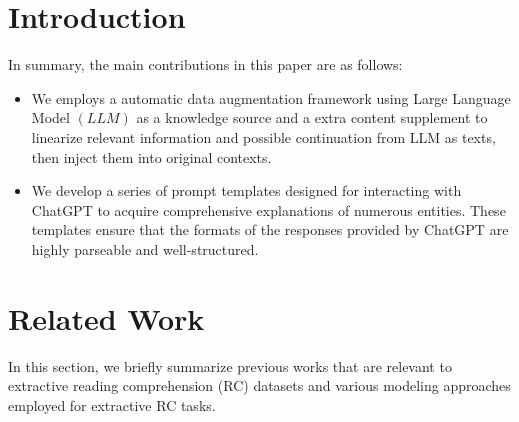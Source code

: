 \documentclass[a4paper,fleqn,twocolumn]{cas-dc}
\newcommand{\1}[1]{\mathds{1}\left[#1\right]}
\begin{document}

\section{Introduction}
\label{sec:intro}

In summary, the main contributions in this paper are as follows:
\begin{itemize}
	\item We employs a automatic data augmentation framework using Large Language Model \((LLM)\) as a knowledge source and a extra content supplement to linearize relevant information and possible continuation from LLM as texts, then inject them into original contexts. 
	\item We develop a series of prompt templates designed for interacting with ChatGPT to acquire comprehensive explanations of numerous entities. These templates ensure that the formats of the responses provided by ChatGPT are highly parseable and well-structured.
	
\end{itemize}

\section{Related Work}
\label{sec:related}
In this section, we briefly summarize previous works that are relevant to extractive reading comprehension
(RC) datasets and various modeling approaches employed for extractive RC tasks.
\end{document}

